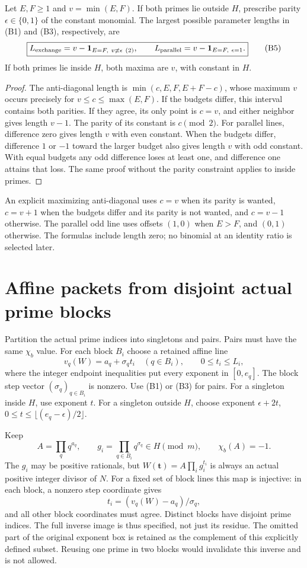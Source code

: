 \begin{theorem}
Let $E,F\ge1$ and $v=\min(E,F)$. If both primes lie outside $H$, prescribe
parity $\epsilon\in\{0,1\}$ of the constant monomial. The largest possible
parameter lengths in (B1) and (B3), respectively, are
\[
 \boxed{
 L_{\rm exchange}=v-\mathbf1_{E=F,\ v\not\equiv\epsilon\ (2)},\qquad
 L_{\rm parallel}=v-\mathbf1_{E=F,\ \epsilon=1}.}            \tag{B5}
\]
If both primes lie inside $H$, both maxima are $v$, with constant in $H$.
\end{theorem}
\begin{proof}
The anti-diagonal length is $\min(c,E,F,E+F-c)$, whose maximum $v$ occurs
precisely for $v\le c\le\max(E,F)$. If the budgets differ, this interval
contains both parities. If they agree, its only point is $c=v$, and either
neighbor gives length $v-1$. The parity of its constant is $c\pmod2$.
For parallel lines, difference zero gives length $v$ with even constant.
When the budgets differ, difference $1$ or $-1$ toward the larger budget also
gives length $v$ with odd constant. With equal budgets any odd difference
loses at least one, and difference one attains that loss. The same proof
without the parity constraint applies to inside primes.
\end{proof}

An explicit maximizing anti-diagonal uses $c=v$ when its parity is wanted,
$c=v+1$ when the budgets differ and its parity is not wanted, and $c=v-1$
otherwise. The parallel odd line uses offsets $(1,0)$ when $E>F$, and
$(0,1)$ otherwise. The formulas include length zero; no binomial at an
identity ratio is selected later.

\section{Affine packets from disjoint actual prime blocks}
Partition the actual prime indices into singletons and pairs. Pairs must
have the same $\chi_b$ value. For each block $B_i$ choose a retained affine
line
\[
 v_q(W)=a_q+\sigma_qt_i\quad(q\in B_i),\qquad 0\le t_i\le L_i,   \tag{C1}
\]
where the integer endpoint inequalities put every exponent in $[0,e_q]$.
The block step vector $(\sigma_q)_{q\in B_i}$ is nonzero. Use (B1) or (B3) for pairs. For a singleton
inside $H$, use exponent $t$. For a singleton outside $H$, choose exponent
$\epsilon+2t$, $0\le t\le\lfloor(e_q-\epsilon)/2\rfloor$.

Keep
\[
 A=\prod_q q^{a_q},\qquad
 g_i=\prod_{q\in B_i}q^{\sigma_q}\in H\pmod m,
 \qquad \chi_b(A)=-1.                                    \tag{C2}
\]
The $g_i$ may be positive rationals, but
$W(\mathbf t)=A\prod_i g_i^{t_i}$ is always an actual positive integer divisor
of $N$. For a fixed set of block lines this map is injective: in each block,
a nonzero step coordinate gives
\[
 t_i=(v_q(W)-a_q)/\sigma_q,
\]
and all other block coordinates must agree. Distinct blocks have disjoint
prime indices. The full inverse image is thus specified, not just its residue.
The omitted part of the original exponent box is retained as the complement
of this explicitly defined subset. Reusing one prime in two blocks would
invalidate this inverse and is not allowed.

